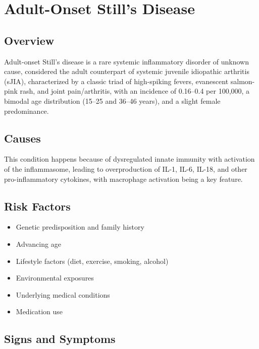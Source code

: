\chapter{Adult-Onset Still's Disease}
\label{sec:Adult-Onset Still's Disease (AOSD)}

\section{Overview}
Adult-onset Still's disease is a rare systemic inflammatory disorder of unknown cause, considered the adult counterpart of systemic juvenile idiopathic arthritis (sJIA), characterized by a classic triad of high-spiking fevers, evanescent salmon-pink rash, and joint pain/arthritis, with an incidence of 0.16--0.4 per 100,000, a bimodal age distribution (15--25 and 36--46 years), and a slight female predominance.
\section{Causes}
This condition happens because of dysregulated innate immunity with activation of the inflammasome, leading to overproduction of IL-1, IL-6, IL-18, and other pro-inflammatory cytokines, with macrophage activation being a key feature.     
\section{Risk Factors}

\begin{itemize}[noitemsep]
  \item Genetic predisposition and family history
  \item Advancing age
  \item Lifestyle factors (diet, exercise, smoking, alcohol)
  \item Environmental exposures
  \item Underlying medical conditions
  \item Medication use
\end{itemize}
\section{Signs and Symptoms}

